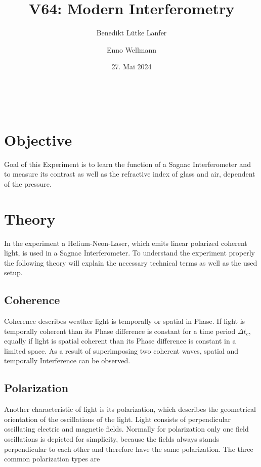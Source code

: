 

\title{V64: Modern Interferometry}
\author{Benedikt Lütke Lanfer \and Enno Wellmann}
\date{27. Mai 2024}
\publishers{TU Dortmund – Fakultät Physik}



\tableofcontents
\newpage
\let\t\text\


% 
\section{Objective}
Goal of this Experiment is to learn the function of a Sagnac Interferometer and to measure its contrast as well as the 
refractive index of glass and air, dependent of the pressure. 


\section{Theory}
In the experiment a Helium-Neon-Laser, which emits linear polarized coherent light, is used in a Sagnac Interferometer.
To understand the experiment properly the following theory will explain the necessary technical terms as well as the used setup. 

\subsection{Coherence}
Coherence describes weather light is temporally or spatial in Phase. 
If light is temporally coherent than its Phase difference is constant for a time period $\Delta t_c$, 
equally if light is spatial coherent than its Phase difference is constant in a limited space. 
As a result of superimposing two coherent waves, spatial and temporally Interference can be observed.

\subsection{Polarization}
Another characteristic of light is its polarization, which describes the geometrical orientation of the oscillations of the light. 
Light consists of perpendicular oscillating electric and magnetic fields.
Normally for polarization only one field oscillations is depicted for simplicity, because the fields always stands perpendicular to each other and
therefore have the same polarization.
The three common polarization types are

